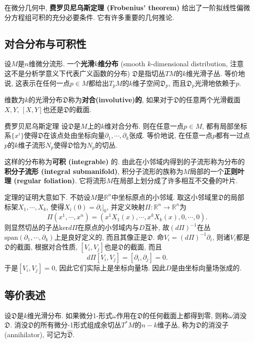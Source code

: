 
在微分几何中, \textbf{费罗贝尼乌斯定理 (Frobenius' theorem)} 给出了一阶拟线性偏微分方程组可积的充分必要条件. 它有许多重要的几何推论.

\subsection{对合分布与可积性}
设$M$是$n$维微分流形. 一个\textbf{光滑$k$维分布} (smooth $k$-dimensional distribution, 注意这不是分析学意义下代表广义函数的分布) $\mathfrak{D}$是指切丛$TM$的$k$维光滑子丛. 等价地说, 这表示在任何一点$p\in M$都给出$T_pM$的$k$维子空间$\mathfrak{D}_p$, 而且$\mathfrak{D}_p$光滑地依赖于$p$. 

维数为$k$的光滑分布$\mathfrak{D}$称为\textbf{对合(involutive)的}, 如果对于$\mathfrak{D}$的任意两个光滑截面$X,Y$, $[X,Y]$也还是$\mathfrak{D}$的截面. 

\begin{theorem}{费罗贝尼乌斯定理}
设$\mathfrak{D}$是$M$上的$k$维对合分布. 则在任意一点$p\in M$, 都有局部坐标系$\{x^i\}$使得$\mathfrak{D}$在该点处由坐标向量$\partial_1,\cdots ,\partial_k$张成. 等价地说, 在任意一点$p$都有一过点$p$的$k$维子流形$N_p$使得$\mathfrak{D}$恰为$N_p$的切丛.
\end{theorem}
这样的分布称为\textbf{可积 (integrable)} 的. 由此在小邻域内得到的子流形称为分布的\textbf{积分子流形 (integral submanifold)}, 积分子流形的族称为$M$局部的一个\textbf{正则叶理 (regular foliation)}. 它将流形$M$在局部上划分成了许多相互不交叠的叶片.

定理的证明大意如下. 不妨设$M$是$\mathbb{R}^n$中坐标原点的小邻域. 取这小邻域里$\mathfrak{D}$的局部标架$X_1,\cdots ,X_k$, 使得$X_i(0)=\partial_i|_0$, 并定义映射$\Pi: \mathbb{R}^n\to \mathbb{R}^n$为
$$
\Pi(x^1,\cdots ,x^n)=(x^1X_1(x),\cdots ,x^kX_k(x),0,\cdots ,0).
$$
则显然切丛的子丛$\text{ker}d\Pi$在原点的小邻域内与$D$互补, 故$(d\Pi)^{-1}$在丛$\text{span}(\partial_1,\cdots ,\partial_k)$上是良好定义的, 而且其像正是$\mathfrak{D}$. 命$V_i=(d\Pi)^{-1}\partial_i$, 则诸$V_i$都是$\mathfrak{D}$的截面, 根据对合性质, $[V_i,V_j]$也是$\mathfrak{D}$的截面, 而且
$$
d\Pi[V_i,V_j]=[\partial_i,\partial_j]=0.
$$
于是$[V_i,V_j]=0$, 因此它们实际上是坐标向量场. 因此$D$是由坐标向量场张成的. 

\subsection{等价表述}
设$\mathfrak{D}$是$k$维光滑分布. 如果微分1-形式$\omega$作用在$\mathfrak{D}$的任何截面上都得到零, 则称$\omega$消没$\mathfrak{D}$. 消没$\mathfrak{D}$的所有微分-1形式组成余切丛$T^*M$的$n-k$维子丛, 称为$\mathfrak{D}$的消没子 (annihilator), 可记为$\hat{\mathfrak{D}}$. 

